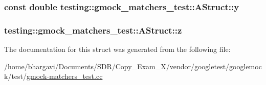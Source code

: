 \subsubsection[{\texorpdfstring{y}{y}}]{\setlength{\rightskip}{0pt plus 5cm}const double testing\+::gmock\+\_\+matchers\+\_\+test\+::\+A\+Struct\+::y}\hypertarget{structtesting_1_1gmock__matchers__test_1_1_a_struct_a08b8592764aa4775c3d5a3542470f8bb}{}\label{structtesting_1_1gmock__matchers__test_1_1_a_struct_a08b8592764aa4775c3d5a3542470f8bb}
\subsubsection[{\texorpdfstring{z}{z}}]{ testing\+::gmock\+\_\+matchers\+\_\+test\+::\+A\+Struct\+::z}\hypertarget{structtesting_1_1gmock__matchers__test_1_1_a_struct_a45b1006e4a7b21037610a385dcae6d8c}{}\label{structtesting_1_1gmock__matchers__test_1_1_a_struct_a45b1006e4a7b21037610a385dcae6d8c}


The documentation for this struct was generated from the following file\+:\begin{DoxyCompactItemize}
\item 
/home/bhargavi/\+Documents/\+S\+D\+R/\+Copy\+\_\+\+Exam\+\_\+X/vendor/googletest/googlemock/test/\hyperlink{gmock-matchers__test_8cc}{gmock-\/matchers\+\_\+test.\+cc}\end{DoxyCompactItemize}
